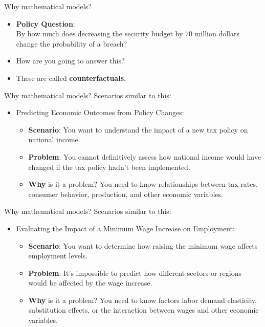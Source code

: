 \documentclass[aspectratio=169,10pt]{beamer}
\newcommand{\emphcolor}[1]{\textbf{\textcolor{emphcolorval}{#1}}}
\begin{document}
\begin{frame}{Why mathematical models?}
	\begin{itemize}
		\item \emphcolor{Policy Question}: \\
		By how much does decreasing the security budget by $70$ million dollars change the probability of a breach?
		\vspace{0.05in}
		\item How are you going to answer this?
		\vspace{0.05in}
		\item These are called \emphcolor{counterfactuals}.
	\end{itemize}
\end{frame}

\begin{frame}{Why mathematical models?}
	Scenarios similar to this:
	\begin{itemize}
		\item Predicting Economic Outcomes from Policy Changes:
		\begin{itemize}
			\item {\bf Scenario}: You want to understand the impact of a new tax policy on national income.
			\vspace{0.025in}
			\item {\bf Problem}: You cannot definitively assess how national income would have changed if the tax policy hadn't been implemented.
			\vspace{0.025in}
			\item {\bf Why} is it a problem? You need to know relationships between tax rates, consumer behavior, production, and other economic variables.
		\end{itemize}
	\end{itemize}
	
\end{frame}

\begin{frame}{Why mathematical models?}
	Scenarios similar to this:
	\begin{itemize}
		\item Evaluating the Impact of a Minimum Wage Increase on Employment:
		\begin{itemize}
			\item {\bf Scenario}: You want to determine how raising the minimum wage affects employment levels.
			\vspace{0.025in}
			\item {\bf Problem}: It's impossible to predict how different sectors or regions would be affected by the wage increase.
			\vspace{0.025in}
			\item {\bf Why} is it a problem? You need to know factors labor demand elasticity, substitution effects, or the interaction between wages and other economic variables.
		\end{itemize}
	\end{itemize}
	
\end{frame}
\end{document}
